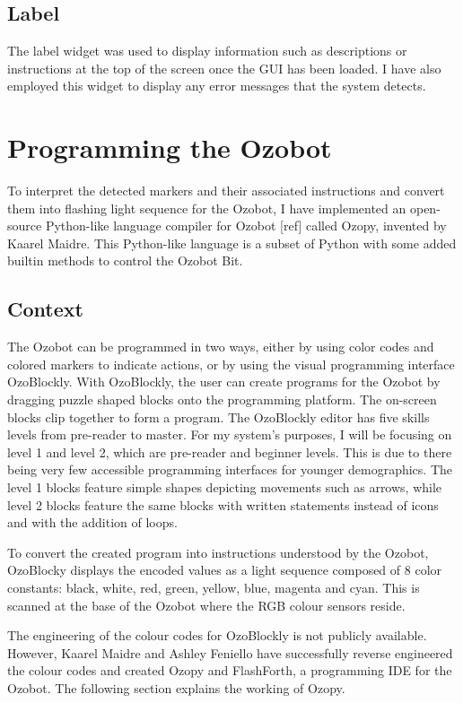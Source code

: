 \documentclass[oneside,%
                    author={Malak Hajji},
                    degree={BSc},
                    title={Designing An Accessible Computational Toolkit For Students},
                  subtitle={With Mixed Visual Abilities}]{dissertation}
\begin{document}
\subsection{Label}
The label widget was used to display information such as descriptions or instructions at the top of the screen once the GUI has been loaded. I have also employed this widget to display any error messages that the system detects.

\section{Programming the Ozobot}
To interpret the detected markers and their associated instructions and convert them into flashing light sequence for the Ozobot, I have implemented an open-source Python-like language compiler for Ozobot [ref] called Ozopy, invented by Kaarel Maidre. This Python-like language is a subset of Python with some added builtin methods to control the Ozobot Bit.

\subsection{Context}

The Ozobot can be programmed in two ways, either by using color codes and colored markers to indicate actions, or by using the visual programming interface OzoBlockly. With OzoBlockly, the user can create programs for the Ozobot by dragging puzzle shaped blocks onto the programming platform. The on-screen blocks clip together to form a program. The OzoBlockly editor has five skills levels from pre-reader to master.
For my system’s purposes, I will be focusing on level 1 and level 2, which are pre-reader and beginner levels. This is due to there being very few accessible programming interfaces for younger demographics. The level 1 blocks feature simple shapes depicting movements such as arrows, while level 2 blocks feature the same blocks with written statements instead of icons and with the addition of loops. 

To convert the created program into instructions understood by the Ozobot, OzoBlocky displays the encoded values as a light sequence composed of 8 color constants: black, white, red, green, yellow, blue, magenta and cyan. This is scanned at the base of the Ozobot where the RGB colour sensors reside. 

The engineering of the colour codes for OzoBlockly is not publicly available. However, Kaarel Maidre and Ashley Feniello have successfully reverse engineered the colour codes and created Ozopy and FlashForth, a programming IDE for the Ozobot. The following section explains the working of Ozopy.  
\end{document}
